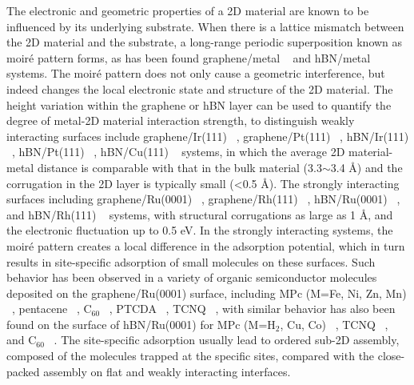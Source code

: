 The electronic and geometric properties of a 2D material are known to be
influenced by its underlying substrate. When there is a lattice
mismatch between the 2D material and the substrate, a long-range
periodic superposition known as moiré pattern forms, as has been
found graphene/metal ~\autocite{Hamalainen_2013_moire_gr} and hBN/metal
~\autocite{Schulz_2014_hBN_moire} systems.  The
moiré pattern does not only cause a geometric interference, but
indeed changes the local electronic state and structure of the 2D
material.
%
The height variation within the graphene or hBN layer can be used to
quantify the degree of metal-2D material interaction strength, to
distinguish weakly interacting surfaces include graphene/Ir(111)
~\autocite{Pletikosi_2009_gr_Ir,Busse_2011_Gr_Ir,Hamalainen_2013_moire_gr},
graphene/Pt(111) ~\autocite{Sutter_2009_Gr_Pt}, hBN/Ir(111)
~\autocite{Schulz_2014_hBN_moire}, hBN/Pt(111) ~\autocite{Cavar_2008_hBN_Pt},
hBN/Cu(111) ~\autocite{Joshi_2012_hBN_Cu} systems, in which the average 2D
material-metal distance is comparable with that in the bulk material
(3.3$\sim{}$3.4 \AA{}) and the corrugation in the 2D layer is
typically small (<0.5 \AA{}). The strongly interacting surfaces
including graphene/\allowbreak{}Ru(0001)
~\autocite{Moritz_2010_gr_Ru,Sutter_2008_gr_Ru}, graphene/Rh(111)
~\autocite{Wang_2010_gr_Rh}, hBN/Ru(0001) ~\autocite{Wang_2010_gr_Rh}, and
hBN/Rh(111) ~\autocite{Dil_2008_hBN_Rh} systems, with structural
corrugations as large as 1 \AA{}, and the electronic fluctuation up to
0.5 eV. In the strongly interacting systems, the moiré pattern creates
a local difference in the adsorption potential, which in turn results
in site-specific adsorption of small molecules on these surfaces. Such
behavior has been observed in a variety of organic semiconductor
molecules deposited on the graphene/\allowbreak{}Ru(0001) surface,
including MPc (M=Fe, Ni, Zn, Mn)
~\autocite{Mao_2009_Pc_gr_kagome,Zhang_2011_FePc_gr}, pentacene
~\autocite{Zhou_2013_penta_gr_Ru}, C\(_{\text{60}}\)
~\autocite{Li_2012_c60_gr_Ru}, PTCDA ~\autocite{Zhou_2011_PTCDA_gr_Ru}, TCNQ
~\autocite{Maccariello_2014_TCNQ_gr_Ru}, with similar behavior has also
been found on the surface of hBN/Ru(0001) for MPc (M=H\(_{\text{2}}\),
Cu, Co) ~\autocite{Dil_2008_hBN_Rh,Jarvinen_2014_MPc_hBN_Ru}, TCNQ
~\autocite{Joshi_2014_TCNQ_hBN}, and C\(_{\text{60}}\)
~\autocite{Corso_2004_C60_hBN}. The site-specific adsorption usually lead
to ordered sub-2D assembly, composed of the molecules trapped at the
specific sites, compared with the close-packed assembly on flat and
weakly interacting interfaces.

